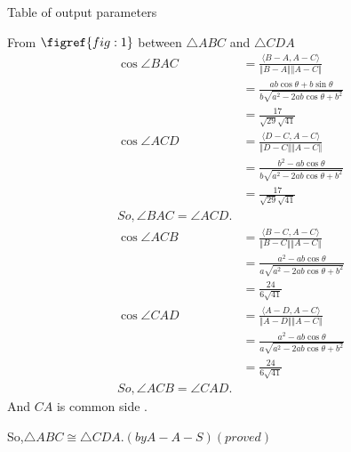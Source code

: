 \documentclass[12pt]{article}
\newcommand\norm[1]{\left\Vert#1\right\Vert}
\providecommand{\brak}[1]{\ensuremath{\left(#1\right)}}
\providecommand{\innpdt}[1]{\ensuremath{\langle#1\rangle}}
\begin{document}
\begin{table}[H]
    \centering
    
    \caption{Table of output parameters}
    \label{tab:tab:2}
\end{table}  
From $\figref{fig:1}$ between $\triangle ABC $ and $\triangle CDA$
\begin{align}
\cos{\angle BAC} &= \frac{\innpdt{B-A,A-C}}{\norm{B-A}\norm{A-C}}\\
&=\frac{ab\cos{\theta}+b\sin{\theta}}{b\sqrt{a^2-2ab\cos{\theta}+b^2}}\\
&=\frac{17}{\sqrt{29}\sqrt{41}}\\
\cos{\angle ACD} &= \frac{\innpdt{D-C,A-C}}{\norm{D-C}\norm{A-C}}\\
&= \frac{b^2-ab\cos{\theta}}{b\sqrt{a^2-2ab\cos{\theta}+b^2}}\\
&=\frac{17}{\sqrt{29}\sqrt{41}}\\
So,\angle BAC = \angle ACD.\\
\cos{\angle ACB} &= \frac{\innpdt{B-C,A-C}}{\norm{B-C}\norm{A-C}}\\
&=\frac{a^2-ab\cos{\theta}}{a\sqrt{a^2-2ab\cos{\theta}+b^2}}\\
&=\frac{24}{6\sqrt{41}}\\
\cos{\angle} CAD &= \frac{\innpdt{A-D,A-C}}{\norm{A-D}\norm{A-C}}\\
&=\frac{a^2-ab\cos{\theta}}{a\sqrt{a^2-2ab\cos{\theta}+b^2}}\\
&=\frac{24}{6\sqrt{41}}\\
So,\angle ACB = \angle CAD.
\end{align}
And $CA$ is common side .

So,$\triangle ABC \cong \triangle CDA.\brak{by A-A-S}\brak{proved}$
\end{document}
